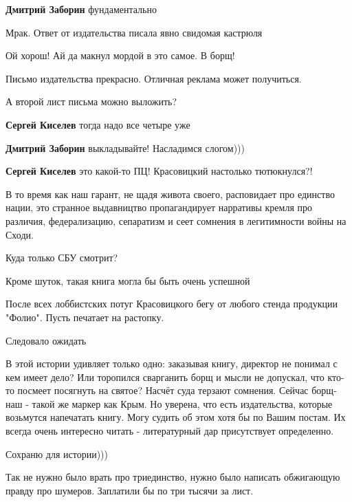 \begin{itemize}
\begin{itemize}
\textbf{Дмитрий Заборин} фундаментально
\end{itemize} %

Мрак. Ответ от издательства писала явно свидомая кастрюля

Ой хорош! Ай да макнул мордой в это самое. В борщ!


Письмо издательства прекрасно. Отличная реклама может получиться.

А второй лист письма можно выложить?

\begin{itemize} %
\textbf{Сергей Киселев} тогда надо все четыре уже

\textbf{Дмитрий Заборин} выкладывайте! Насладимся слогом)))

\textbf{Сергей Киселев} это какой-то ПЦ! Красовицкий настолько тютюкнулся?!
\end{itemize} %


В то время как наш гарант, не щадя живота своего, расповидает про единство
нации, это странное выдавництво пропагандирует нарративы кремля про различия,
федерализацию, сепаратизм и сеет сомнения в легитимности войны на Сходи.

Куда только СБУ смотрит?

Кроме шуток, такая книга могла бы быть очень успешной

После всех лоббистских потуг Красовицкого бегу от любого стенда продукции "Фолио". Пусть печатает на растопку.

Следовало ожидать


В этой истории удивляет только одно: заказывая книгу, директор не понимал с кем
имеет дело? Или торопился сварганить борщ и мысли не допускал, что кто-то
посмеет посягнуть на святое? Насчёт суда терзают сомнения. Сейчас борщ-наш -
такой же маркер как Крым. Но уверена, что есть издательства, которые возьмутся
напечатать книгу. Могу судить об этом хотя бы по Вашим постам. Их всегда очень
интересно читать - литературный дар присутствует определенно.


Сохраню для истории)))

Так не нужно было врать про триединство, нужно было написать обжигающую правду про шумеров. Заплатили бы по три тысячи за лист.


\end{itemize}
